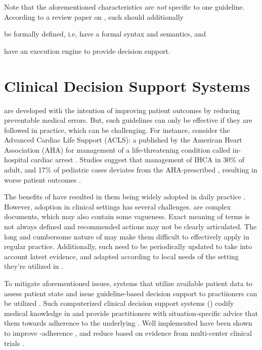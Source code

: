 Note that the aforementioned characteristics are \emph{not} specific
to one guideline. According to a review paper on \CIGs{} \cite{ClerqAIM03},
such \DSLs{} should additionally
\begin{enumerate*}[label=(\alph*)]
  \item be formally defined, i.e, have a formal syntax and semantics, and
  \item have an execution engine to provide decision support.
\end{enumerate*}

\section{Clinical Decision Support Systems}\label{sec:cdss-background}

\BPGs{} are developed with the intention of improving patient outcomes
by reducing preventable medical errors. But, such guidelines can only be
effective if they are followed in practice, which can be challenging.
 For instance, consider the Advanced Cardiac Life Support (ACLS):
a \BPG{} published by the American Heart Association (AHA) for management
of a life-threatening condition called in-hospital cardiac arrest
\cite{AHAGuidelineAdult, AHAGuidelinePed}. Studies suggest that management
of IHCA in 30\% of adult, and 17\% of pediatric cases deviates from the
AHA-prescribed \BPG{}, resulting in worse patient outcomes \cite{Ornato2012DeviationAdult,Wolfe2020DeviationPediatric,
Crowley2020DeviationAdult,Honarmand2018Adherence,Mcevoy2014Adherence}.

The benefits of \BPGs{} have resulted in them being widely adopted
in daily practice \cite{WoolfBMJ99}. However, \BPG{} adoption in
clinical settings has several challenges. \BPGs{} are complex documents,
which may also contain some vagueness.
Exact meaning of terms is not always defined and recommended
actions may not be clearly articulated. The long and cumbersome
nature of \BPGs{} may make them difficult to effectively apply
in regular practice. Additionally, such \BPGs{} need to be
periodically updated to take into account latest evidence, and
adapted according to local needs of the setting they're utilized
in \cite{DeClerqSHTI08}.

To mitigate aforementioned issues, systems that utilize available
patient data to assess patient state and issue guideline-based
decision support to practiioners can be utilized \cite{DeClerqSHTI08}.
Such computerized clinical decision support systems (\CDSSs{}) codify
medical knowledge in \BPGs{} and provide practitioners with
situation-specific advice that  them towards adherence
to the underlying \BPG{}.
Well implemented \CDSSs{} have been shown to improve
\BPG{}-adherence \cite{GargJAMA06,KawamotoBMJ05}, and reduce
\PMEs{} based on evidence from multi-center clinical trials \cite{BenettJAMIA16,SahotaJIS11}.

